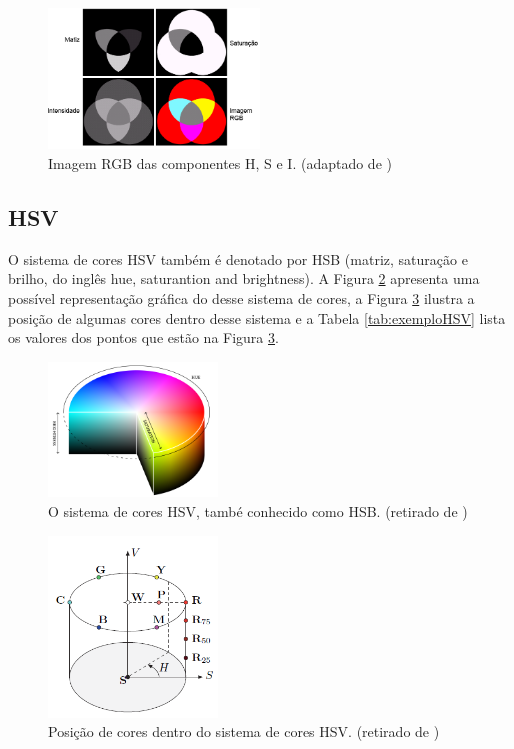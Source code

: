 \documentclass[	12pt, Times, openright, twoside, a4paper, english, brazil]{abntex2}
\begin{document}
\begin{figure}[!htb]
\centering \includegraphics[width=0.5\textwidth]{figuraComponentesHSI2.png}
\caption{Imagem RGB das componentes H, S e I. (adaptado de ) \label{fig:figuraComponentesHSI2}}
\end{figure}

\subsection{HSV}

O sistema de cores HSV também é denotado por HSB (matriz, saturação e brilho, do inglês hue, saturantion and brightness)\cite{burger2009digital}. A Figura \ref{fig:figuraHSV} apresenta uma possível representação gráfica do desse sistema de cores, a Figura \ref{fig:figuraHSV2} ilustra a posição de algumas cores dentro desse sistema e a Tabela \ref{tab:exemploHSV} lista os valores dos pontos que estão na Figura \ref{fig:figuraHSV2}.

\begin{figure}[!htb]
\centering \includegraphics[width=0.4\textwidth]{figuraHSV.png}
\caption{O sistema de cores HSV, també conhecido como HSB. (retirado de ) \label{fig:figuraHSV}}
\end{figure}

\begin{figure}[!htb]
\centering \includegraphics[width=0.4\textwidth]{figuraHSV2.png}
\caption{Posição de cores dentro do sistema de cores HSV. (retirado de ) \label{fig:figuraHSV2}}
\end{figure}
\end{document}
